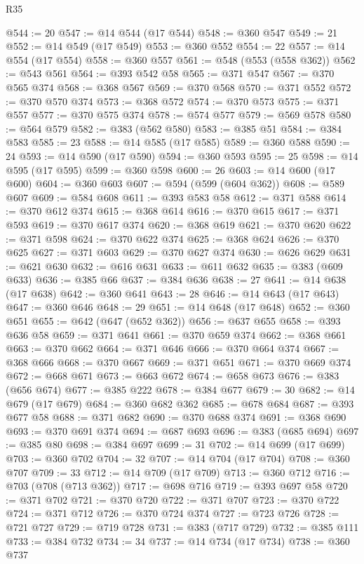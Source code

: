 \begin{lexlean}{R35}
\begin{coremodule}
@544 := 20
@547 := @14 @544 (@17 @544)
@548 := @360 @547
@549 := 21
@552 := @14 @549 (@17 @549)
@553 := @360 @552
@554 := 22
@557 := @14 @554 (@17 @554)
@558 := @360 @557
@561 := @548 (@553 (@558 @362))
@562 := @543 @561
@564 := @393 @542 @58
@565 := @371 @547
@567 := @370 @565 @374
@568 := @368 @567
@569 := @370 @568
@570 := @371 @552
@572 := @370 @570 @374
@573 := @368 @572
@574 := @370 @573
@575 := @371 @557
@577 := @370 @575 @374
@578 := @574 @577
@579 := @569 @578
@580 := @564 @579
@582 := @383 (@562 @580)
@583 := @385 @51
@584 := @384 @583
@585 := 23
@588 := @14 @585 (@17 @585)
@589 := @360 @588
@590 := 24
@593 := @14 @590 (@17 @590)
@594 := @360 @593
@595 := 25
@598 := @14 @595 (@17 @595)
@599 := @360 @598
@600 := 26
@603 := @14 @600 (@17 @600)
@604 := @360 @603
@607 := @594 (@599 (@604 @362))
@608 := @589 @607
@609 := @584 @608
@611 := @393 @583 @58
@612 := @371 @588
@614 := @370 @612 @374
@615 := @368 @614
@616 := @370 @615
@617 := @371 @593
@619 := @370 @617 @374
@620 := @368 @619
@621 := @370 @620
@622 := @371 @598
@624 := @370 @622 @374
@625 := @368 @624
@626 := @370 @625
@627 := @371 @603
@629 := @370 @627 @374
@630 := @626 @629
@631 := @621 @630
@632 := @616 @631
@633 := @611 @632
@635 := @383 (@609 @633)
@636 := @385 @66
@637 := @384 @636
@638 := 27
@641 := @14 @638 (@17 @638)
@642 := @360 @641
@643 := 28
@646 := @14 @643 (@17 @643)
@647 := @360 @646
@648 := 29
@651 := @14 @648 (@17 @648)
@652 := @360 @651
@655 := @642 (@647 (@652 @362))
@656 := @637 @655
@658 := @393 @636 @58
@659 := @371 @641
@661 := @370 @659 @374
@662 := @368 @661
@663 := @370 @662
@664 := @371 @646
@666 := @370 @664 @374
@667 := @368 @666
@668 := @370 @667
@669 := @371 @651
@671 := @370 @669 @374
@672 := @668 @671
@673 := @663 @672
@674 := @658 @673
@676 := @383 (@656 @674)
@677 := @385 @222
@678 := @384 @677
@679 := 30
@682 := @14 @679 (@17 @679)
@684 := @360 @682 @362
@685 := @678 @684
@687 := @393 @677 @58
@688 := @371 @682
@690 := @370 @688 @374
@691 := @368 @690
@693 := @370 @691 @374
@694 := @687 @693
@696 := @383 (@685 @694)
@697 := @385 @80
@698 := @384 @697
@699 := 31
@702 := @14 @699 (@17 @699)
@703 := @360 @702
@704 := 32
@707 := @14 @704 (@17 @704)
@708 := @360 @707
@709 := 33
@712 := @14 @709 (@17 @709)
@713 := @360 @712
@716 := @703 (@708 (@713 @362))
@717 := @698 @716
@719 := @393 @697 @58
@720 := @371 @702
@721 := @370 @720
@722 := @371 @707
@723 := @370 @722
@724 := @371 @712
@726 := @370 @724 @374
@727 := @723 @726
@728 := @721 @727
@729 := @719 @728
@731 := @383 (@717 @729)
@732 := @385 @111
@733 := @384 @732
@734 := 34
@737 := @14 @734 (@17 @734)
@738 := @360 @737

\end{coremodule}
\end{lexlean}
